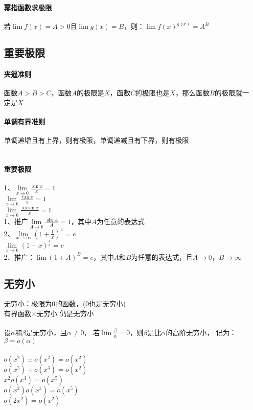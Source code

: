 \documentclass{article}
\begin{document}
\begin{flushleft}
\paragraph{幂指函数求极限}
若$\lim f(x)=A>0$且$\lim g(x)=B$，则：$\lim f(x)^{g(x)}=A^B$\\

\subsection{重要极限}

\paragraph{夹逼准则}
函数$A>B>C$，函数$A$的极限是$X$，函数$C$的极限也是$X$，那么函数$B$的极限就一定是$X$\\
\paragraph{单调有界准则}
单调递增且有上界，则有极限，单调递减且有下界，则有极限\\
~\\
\paragraph{重要极限}
1、$\lim\limits_{x\to 0} \frac{\sin x}{x}=1$\\
\qquad $\lim\limits_{x\to 0} \frac{\tan x}{x}=1$\\
\qquad $\lim\limits_{x\to 0} \frac{\arcsin x}{x}=1$\\
1、推广$\lim\limits_{A\to 0} \frac{\sin A}{A}=1$，其中$A$为任意的表达式\\
2、$\lim\limits_{x\to \infty} (1+\frac{1}{x})^x=e$\\
\qquad $\lim\limits_{x\to 0} (1+x)^{\frac{1}{x}}=e$\\
2、推广：$\lim (1+A)^{B}=e$，其中$A$和$B$为任意的表达式，且$A\to 0$，$B\to\infty$\\

\subsection{无穷小}

无穷小：极限为0的函数，(0也是无穷小)\\
有界函数$\times$无穷小 仍是无穷小\\
~\\
设$\alpha$和$\beta$是无穷小，且$\alpha \neq 0$，
若$\lim \frac{\beta}{\alpha}=0$，则$\beta$是比$\alpha$的高阶无穷小，
记为：$\beta = o(\alpha)$\\
~\\
$o(x^2)\pm o(x^2)=o(x^2)$\\
$o(x^2)\pm o(x^3)=o(x^2)$\\
$x^2 o(x^3)=o(x^5)$\\
$o(x^2) o(x^3)=o(x^5)$\\
$o(2x^2)=o(x^2)$\\


\end{flushleft}
\end{document}
